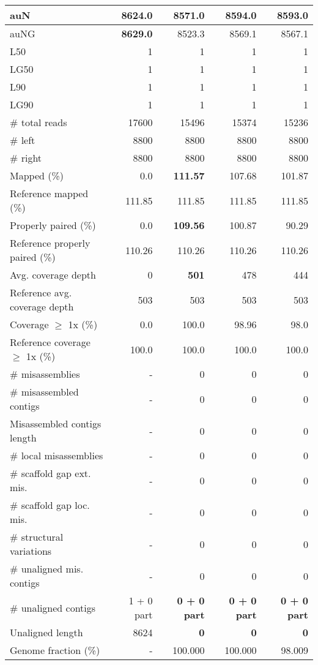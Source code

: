 \documentclass[12pt,a4paper]{article}
\begin{document}
\begin{table}[ht]
\begin{center}
\begin{tabular}{|l*{4}{|r}|}
auN & {\bf 8624.0} & 8571.0 & 8594.0 & 8593.0 \\ \hline
auNG & {\bf 8629.0} & 8523.3 & 8569.1 & 8567.1 \\ \hline
L50 & 1 & 1 & 1 & 1 \\ \hline
LG50 & 1 & 1 & 1 & 1 \\ \hline
L90 & 1 & 1 & 1 & 1 \\ \hline
LG90 & 1 & 1 & 1 & 1 \\ \hline
\# total reads & 17600 & 15496 & 15374 & 15236 \\ \hline
\# left & 8800 & 8800 & 8800 & 8800 \\ \hline
\# right & 8800 & 8800 & 8800 & 8800 \\ \hline
Mapped (\%) & 0.0 & {\bf 111.57} & 107.68 & 101.87 \\ \hline
Reference mapped (\%) & 111.85 & 111.85 & 111.85 & 111.85 \\ \hline
Properly paired (\%) & 0.0 & {\bf 109.56} & 100.87 & 90.29 \\ \hline
Reference properly paired (\%) & 110.26 & 110.26 & 110.26 & 110.26 \\ \hline
Avg. coverage depth & 0 & {\bf 501} & 478 & 444 \\ \hline
Reference avg. coverage depth & 503 & 503 & 503 & 503 \\ \hline
Coverage $\geq$ 1x (\%) & 0.0 & 100.0 & 98.96 & 98.0 \\ \hline
Reference coverage $\geq$ 1x (\%) & 100.0 & 100.0 & 100.0 & 100.0 \\ \hline
\# misassemblies & - & 0 & 0 & 0 \\ \hline
\# misassembled contigs & - & 0 & 0 & 0 \\ \hline
Misassembled contigs length & - & 0 & 0 & 0 \\ \hline
\# local misassemblies & - & 0 & 0 & 0 \\ \hline
\# scaffold gap ext. mis. & - & 0 & 0 & 0 \\ \hline
\# scaffold gap loc. mis. & - & 0 & 0 & 0 \\ \hline
\# structural variations & - & 0 & 0 & 0 \\ \hline
\# unaligned mis. contigs & - & 0 & 0 & 0 \\ \hline
\# unaligned contigs & 1 + 0 part & {\bf 0 + 0 part} & {\bf 0 + 0 part} & {\bf 0 + 0 part} \\ \hline
Unaligned length & 8624 & {\bf 0} & {\bf 0} & {\bf 0} \\ \hline
Genome fraction (\%) & - & 100.000 & 100.000 & 98.009 \\ \hline

\end{tabular}
\end{center}
\end{table}
\end{document}
